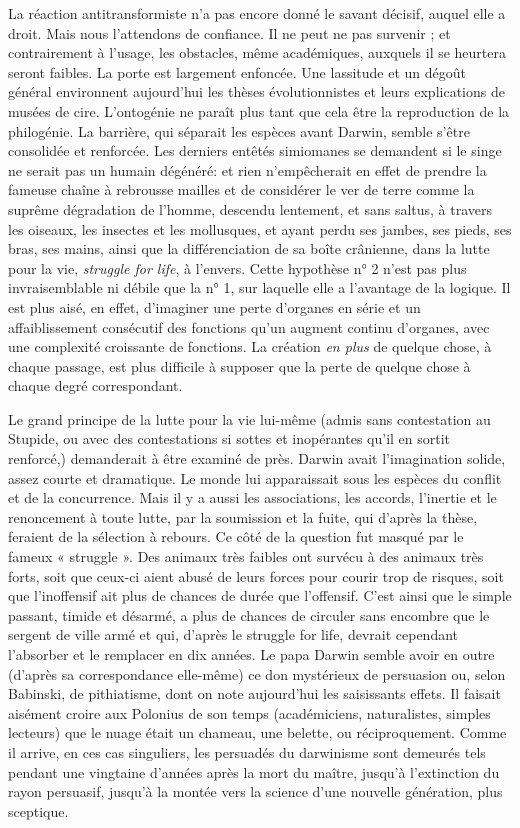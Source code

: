 \documentclass[french,twoside]{book} %
\begin{document}
La réaction antitransformiste n’a pas encore donné le savant décisif, auquel elle a droit. Mais nous l’attendons de confiance. Il ne peut ne pas survenir ; et contrairement à l’usage, les obstacles, même académiques, auxquels il se heurtera seront faibles. La porte est largement enfoncée. Une lassitude et un dégoût général environnent aujourd’hui les thèses évolutionnistes et leurs explications de musées de cire. L’ontogénie ne paraît plus tant que cela être la reproduction de la philogénie. La barrière, qui séparait les espèces avant Darwin, semble s’être consolidée et renforcée. Les derniers entêtés simiomanes se demandent si le singe ne serait pas un humain dégénéré: et rien n’empêcherait en effet de prendre la fameuse chaîne à rebrousse mailles et de considérer le ver de terre comme la suprême dégradation de l’homme, descendu lentement, et sans saltus, à travers les oiseaux, les insectes et les mollusques, et ayant perdu ses jambes, ses pieds, ses bras, ses mains, ainsi que la différenciation de sa boîte crânienne, dans la lutte pour la vie, {\itshape struggle for life}, à l’envers. Cette hypothèse n° 2 n’est pas plus invraisemblable ni débile que la n° 1, sur laquelle elle a l’avantage de la logique. Il est plus aisé, en effet, d’imaginer une perte d’organes en série et un affaiblissement consécutif des fonctions qu’un augment continu d’organes, avec une complexité croissante de fonctions. La création {\itshape en plus} de quelque chose, à chaque passage, est plus difficile à supposer que la perte de quelque chose à chaque degré correspondant.\par
Le grand principe de la lutte pour la vie lui-même (admis sans contestation au Stupide, ou avec des contestations si sottes et inopérantes qu’il en sortit renforcé,) demanderait à être examiné de près. Darwin avait l’imagination solide, assez courte et dramatique. Le monde lui apparaissait sous les espèces du conflit et de la concurrence. Mais il y a aussi les associations, les accords, l’inertie et le renoncement à toute lutte, par la soumission et la fuite, qui d’après la thèse, feraient de la sélection à rebours. Ce côté de la question fut masqué par le fameux « struggle ». Des animaux très faibles ont survécu à des animaux très forts, soit que ceux-ci aient abusé de leurs forces pour courir trop de risques, soit que l’inoffensif ait plus de chances de durée que l’offensif. C’est ainsi que le simple passant, timide et désarmé, a plus de chances de circuler sans encombre que le sergent de ville armé et qui, d’après le struggle for life, devrait cependant l’absorber et le remplacer en dix années. Le papa Darwin semble avoir en outre (d’après sa correspondance elle-même) ce don mystérieux de persuasion ou, selon Babinski, de pithiatisme, dont on note aujourd’hui les saisissants effets. Il faisait aisément croire aux Polonius de son temps (académiciens, naturalistes, simples lecteurs) que le nuage était un chameau, une belette, ou réciproquement. Comme il arrive, en ces cas singuliers, les persuadés du darwinisme sont demeurés tels pendant une vingtaine d’années après la mort du maître, jusqu’à l’extinction du rayon persuasif, jusqu’à la montée vers la science d’une nouvelle génération, plus sceptique.\par
\end{document}
